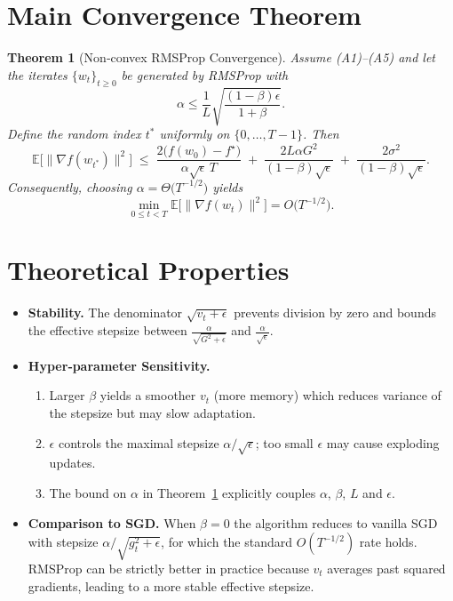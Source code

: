 \documentclass{article}
\newtheorem{theorem}{Theorem}
\newcommand{\E}{\mathbb{E}}
\begin{document}
\section*{Main Convergence Theorem}
\begin{theorem}[Non‑convex RMSProp Convergence]
\label{thm:main}
Assume (A1)–(A5) and let the iterates $\{w_t\}_{t\ge0}$ be generated by RMSProp with
\[
\alpha\le \frac{1}{L}\sqrt{\frac{(1-\beta)\epsilon}{1+\beta}} .
\]
Define the random index $t^{*}$ uniformly on $\{0,\dots,T-1\}$. Then
\[
\E\!\Big[\|\nabla f(w_{t^{*}})\|^{2}\Big]
\;\le\;
\frac{2\big(f(w_0)-f^{\star}\big)}{\alpha\sqrt{\epsilon}\,T}
\;+\;
\frac{2L\alpha G^{2}}{(1-\beta)\sqrt{\epsilon}}
\;+\;
\frac{2\sigma^{2}}{(1-\beta)\sqrt{\epsilon}} .
\tag{4}
\]
Consequently, choosing $\alpha = \Theta\!\big(T^{-1/2}\big)$ yields
\[
\min_{0\le t<T}\E\!\big[\|\nabla f(w_t)\|^{2}\big]= O\!\big(T^{-1/2}\big).
\]
\end{theorem}

\section*{Theoretical Properties}
\begin{itemize}[leftmargin=*]
\item \textbf{Stability.} The denominator $\sqrt{v_t+\epsilon}$ prevents division by zero and bounds the effective stepsize between $\frac{\alpha}{\sqrt{G^{2}+\epsilon}}$ and $\frac{\alpha}{\sqrt{\epsilon}}$.
\item \textbf{Hyper‑parameter Sensitivity.}
    \begin{enumerate}
        \item Larger $\beta$ yields a smoother $v_t$ (more memory) which reduces variance of the stepsize but may slow adaptation.
        \item $\epsilon$ controls the maximal stepsize $\alpha/\sqrt{\epsilon}$; too small $\epsilon$ may cause exploding updates.
        \item The bound on $\alpha$ in Theorem~\ref{thm:main} explicitly couples $\alpha$, $\beta$, $L$ and $\epsilon$.
    \end{enumerate}
\item \textbf{Comparison to SGD.} When $\beta=0$ the algorithm reduces to vanilla SGD with stepsize $\alpha/\sqrt{g_t^{2}+\epsilon}$, for which the standard $O(T^{-1/2})$ rate holds. RMSProp can be strictly better in practice because $v_t$ averages past squared gradients, leading to a more stable effective stepsize.
\end{itemize}
\end{document}
